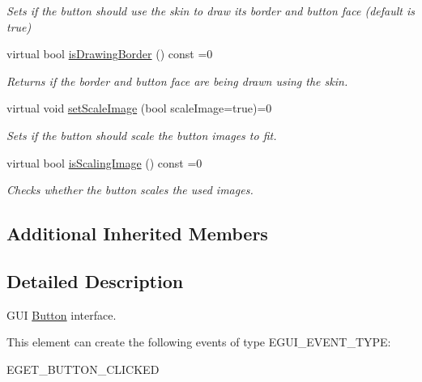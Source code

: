 \begin{DoxyCompactItemize}
\begin{DoxyCompactList}\small\item\em Sets if the button should use the skin to draw its border and button face (default is true) \end{DoxyCompactList}\item 
\mbox{\label{classirr_1_1gui_1_1IGUIButton_af2e1cee431cc5f90cede3820719625f1}} 
virtual bool \hyperlink{classirr_1_1gui_1_1IGUIButton_af2e1cee431cc5f90cede3820719625f1}{is\+Drawing\+Border} () const =0
\begin{DoxyCompactList}\small\item\em Returns if the border and button face are being drawn using the skin. \end{DoxyCompactList}\item 
\mbox{\label{classirr_1_1gui_1_1IGUIButton_ae0767cb927c7974e19eaa3e5ca52bf1f}} 
virtual void \hyperlink{classirr_1_1gui_1_1IGUIButton_ae0767cb927c7974e19eaa3e5ca52bf1f}{set\+Scale\+Image} (bool scale\+Image=true)=0
\begin{DoxyCompactList}\small\item\em Sets if the button should scale the button images to fit. \end{DoxyCompactList}\item 
\mbox{\label{classirr_1_1gui_1_1IGUIButton_af2660457dae6def0b34d4748e96c653a}} 
virtual bool \hyperlink{classirr_1_1gui_1_1IGUIButton_af2660457dae6def0b34d4748e96c653a}{is\+Scaling\+Image} () const =0
\begin{DoxyCompactList}\small\item\em Checks whether the button scales the used images. \end{DoxyCompactList}\end{DoxyCompactItemize}
\subsection*{Additional Inherited Members}


\subsection{Detailed Description}
G\+UI \hyperlink{classButton}{Button} interface. 

\begin{DoxyParagraph}{This element can create the following events of type E\+G\+U\+I\+\_\+\+E\+V\+E\+N\+T\+\_\+\+T\+Y\+PE\+:}
\begin{DoxyItemize}
\item E\+G\+E\+T\+\_\+\+B\+U\+T\+T\+O\+N\+\_\+\+C\+L\+I\+C\+K\+ED \end{DoxyItemize}

\end{DoxyParagraph}


